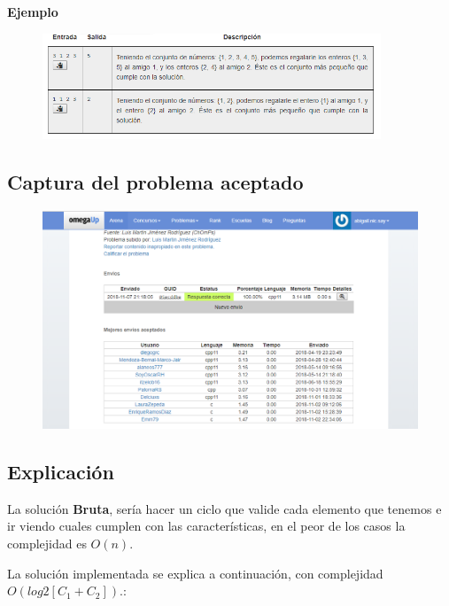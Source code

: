 \documentclass[12pt]{article}
\begin{document}
        \textbf{Ejemplo}    \\
        \begin{figure}[h!]
	        \centering
	        \includegraphics[width=0.9\textwidth]{Abigail/Ejercicio06/Images/2_C.PNG}
	 	\end{figure} 
	 	
\newpage

    \subsection{Captura del problema aceptado}
        \begin{figure}[h!]
	        \centering
	        \includegraphics[width=1.0\textwidth]{Abigail/Ejercicio06/Images/2_A.PNG}
	 	\end{figure} 
      
    \subsection{Explicación}
    La solución \textbf{Bruta}, sería hacer un ciclo que valide cada elemento que tenemos e ir viendo cuales cumplen con las características, en el peor de los casos la complejidad es $O(n)$.
    
    La solución implementada se explica a continuación, con complejidad $O\left(log2[C_{1}+C_{2}]\right)$.:
    
\end{document}
